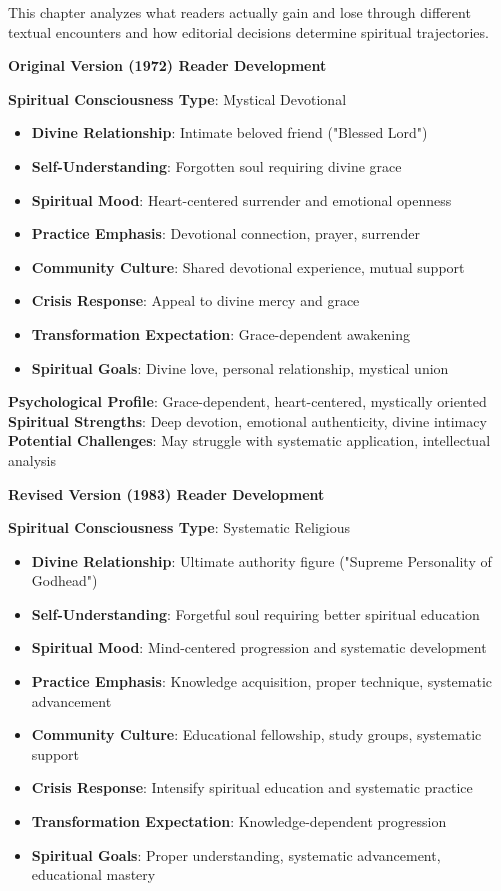 \documentclass[12pt,twoside]{book}
\begin{document}
This chapter analyzes what readers actually gain and lose through different textual encounters and how editorial decisions determine spiritual trajectories.

\textbf{\textbf{Original Version (1972) Reader Development}}

\textbf{\textbf{Spiritual Consciousness Type}}: Mystical Devotional
\begin{itemize}
\item \textbf{\textbf{Divine Relationship}}: Intimate beloved friend ("Blessed Lord")
\item \textbf{\textbf{Self-Understanding}}: Forgotten soul requiring divine grace
\item \textbf{\textbf{Spiritual Mood}}: Heart-centered surrender and emotional openness
\item \textbf{\textbf{Practice Emphasis}}: Devotional connection, prayer, surrender
\item \textbf{\textbf{Community Culture}}: Shared devotional experience, mutual support
\item \textbf{\textbf{Crisis Response}}: Appeal to divine mercy and grace
\item \textbf{\textbf{Transformation Expectation}}: Grace-dependent awakening
\item \textbf{\textbf{Spiritual Goals}}: Divine love, personal relationship, mystical union
\end{itemize}

\textbf{\textbf{Psychological Profile}}: Grace-dependent, heart-centered, mystically oriented
\textbf{\textbf{Spiritual Strengths}}: Deep devotion, emotional authenticity, divine intimacy
\textbf{\textbf{Potential Challenges}}: May struggle with systematic application, intellectual analysis

\textbf{\textbf{Revised Version (1983) Reader Development}}

\textbf{\textbf{Spiritual Consciousness Type}}: Systematic Religious
\begin{itemize}
\item \textbf{\textbf{Divine Relationship}}: Ultimate authority figure ("Supreme Personality of Godhead")
\item \textbf{\textbf{Self-Understanding}}: Forgetful soul requiring better spiritual education
\item \textbf{\textbf{Spiritual Mood}}: Mind-centered progression and systematic development
\item \textbf{\textbf{Practice Emphasis}}: Knowledge acquisition, proper technique, systematic advancement
\item \textbf{\textbf{Community Culture}}: Educational fellowship, study groups, systematic support
\item \textbf{\textbf{Crisis Response}}: Intensify spiritual education and systematic practice
\item \textbf{\textbf{Transformation Expectation}}: Knowledge-dependent progression
\item \textbf{\textbf{Spiritual Goals}}: Proper understanding, systematic advancement, educational mastery
\end{itemize}
\end{document}
